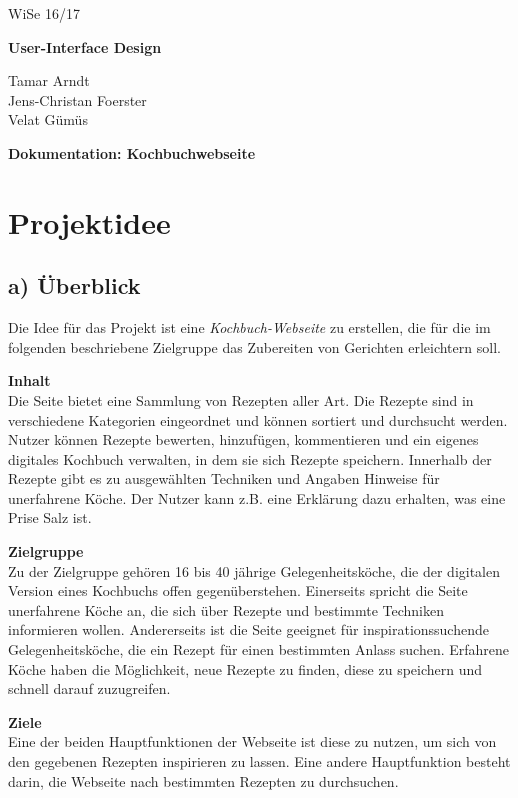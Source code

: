 \documentclass[parskip,10pt,abstracton]{scrartcl}
\renewcommand*{\maketitle}{%
	\begin{flushright}
	{\rmfamily WiSe 16/17 \par}
	\end{flushright}
	\vspace{-1.3cm}
	
	{\bfseries\sffamily User-Interface Design} \\
	{\rmfamily Tamar Arndt \\ Jens-Christan Foerster \\ Velat Gümüs \par}
	
	{\centering\LARGE\sffamily\bfseries Dokumentation: Kochbuchwebseite \par}
	\vspace{1em}
}
\begin{document}
\maketitle

\tableofcontents
\newpage

\section{Projektidee}

\subsection*{a) Überblick}

Die Idee für das Projekt ist eine \textit{Kochbuch-Webseite} zu erstellen, die für die im folgenden beschriebene Zielgruppe das Zubereiten von Gerichten erleichtern soll.

\textbf{Inhalt}\\
Die Seite bietet eine Sammlung von Rezepten aller Art.
Die Rezepte sind in verschiedene Kategorien eingeordnet und können sortiert und durchsucht werden.
Nutzer können Rezepte bewerten, hinzufügen, kommentieren und ein eigenes digitales Kochbuch verwalten, in dem sie sich Rezepte speichern.
Innerhalb der Rezepte gibt es zu ausgewählten Techniken und Angaben Hinweise für unerfahrene Köche. Der Nutzer kann z.B. eine Erklärung dazu erhalten, was eine Prise Salz ist.

\textbf{Zielgruppe}\\
Zu der Zielgruppe gehören 16 bis 40 jährige Gelegenheitsköche, die der digitalen Version eines Kochbuchs offen gegenüberstehen.
Einerseits spricht die Seite unerfahrene Köche an, die sich über Rezepte und bestimmte Techniken informieren wollen. Andererseits ist die Seite geeignet für inspirationssuchende Gelegenheitsköche, die ein Rezept für einen bestimmten Anlass suchen. Erfahrene Köche haben die Möglichkeit, neue Rezepte zu finden, diese zu speichern und schnell darauf zuzugreifen. 

\textbf{Ziele} \\
Eine der beiden Hauptfunktionen der Webseite ist diese zu nutzen, um sich von den gegebenen Rezepten inspirieren zu lassen. Eine andere Hauptfunktion besteht darin, die Webseite nach bestimmten Rezepten zu durchsuchen. 
\end{document}
